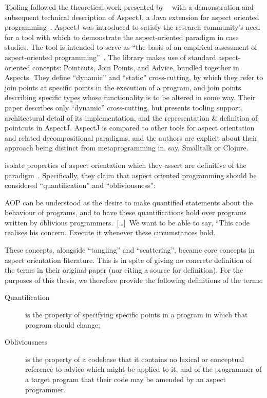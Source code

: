Tooling followed the theoretical work presented by
\citeauthor{kiczales1997aspect}~\cite{kiczales1997aspect} with a demonstration
and subsequent technical description of AspectJ, a Java extension for aspect
oriented programming~\cite{AspectJLanguageAndTools,aspectj_intro}. AspectJ was
introduced to satisfy the research community's need for a tool with which to
demonstrate the aspect-oriented paradigm in case studies. The tool is intended
to serve as ``the basis of an empirical assessment of aspect-oriented
programming''~\cite{aspectj_intro}. The library makes use of standard
aspect-oriented concepts: Pointcuts, Join Points, and Advice, bundled together
in Aspects. They define ``dynamic'' and ``static'' cross-cutting, by which they
refer to join points at specific points in the execution of a program, and join
points describing specific types whose functionality is to be altered in some
way. Their paper describes only ``dynamic'' cross-cutting, but presents tooling
support, architectural detail of its implementation, and the representation \&
definition of pointcuts in AspectJ. AspectJ is compared to other tools for
aspect orientation and related decompositional paradigms, and the authors are
explicit about their approach being distinct from metaprogramming in, say,
Smalltalk or Clojure.


\citeauthor{filman2000aspect} isolate properties of aspect orientation which
they assert are definitive of the paradigm~\cite{filman2000aspect}. Specifically, they claim that aspect
oriented programming should be considered ``quantification'' and
``obliviousness'':

\begin{blockquote}
AOP can be understood as the desire to make quantified statements about the
behaviour of programs, and to have these quantifications hold over programs
written by oblivious programmers.~[\ldots{}]~We want to be able to say, ``This
code realises his concern. Execute it whenever these circumstances hold.
\end{blockquote}

These concepts, alongside ``tangling'' and ``scattering'', became core
concepts in aspect orientation literature. This is in spite of
\citeauthor{filman2000aspect} giving no concrete definition of the terms in
their original paper (nor citing a source for definition). For the purposes of
this thesis, we therefore provide the following definitions of the terms:

\begin{description}
  \item[Quantification] is the property of specifying specific points in a
  program in which that program should change;
  \item[Obliviousness] is the property of a codebase that it contains no
  lexical or conceptual reference to advice which might be applied to it, and of
  the programmer of a target program that their code may be amended by an aspect programmer.
\end{description}

